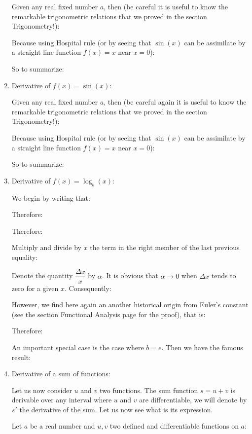\begin{enumerate}
		 Given any real fixed number $a$, then (be careful it is useful to know the remarkable trigonometric relations that we proved in the section Trigonometry!):
		 
		 Because using Hospital rule (or by seeing that $\sin(x)$ can be assimilate by a straight line function $f(x)=x$ near $x=0$):
		 
		 So to summarize:
		 
		 
		 \item Derivative of $f(x)=\sin(x)$:
		 
		 Given any real fixed number $a$, then (be careful again it is useful to know the remarkable trigonometric relations that we proved in the section Trigonometry!):
		 
		 Because using Hospital rule (or by seeing that $\sin(x)$ can be assimilate by a straight line function $f(x)=x$ near $x=0$):
		 
		 So to summarize:
		 
		 \item Derivative of $f(x)=\log_b(x)$:
		 
		 We begin by writing that:
		 
		 Therefore:
		 
		 Therefore:
		 
		 Multiply and divide by $x$ the term in the right member of the last previous equality:
		 
		 Denote the quantity $\dfrac{\Delta x}{x}$ by $\alpha$. It is obvious that $\alpha \rightarrow 0$ when $\Delta x$ tends to zero for a given $x$. Consequently:
		 
		 However, we find here again an another historical origin from Euler's constant (see the section Functional Analysis page \pageref{Euler number} for the proof), that is:
		 
		 Therefore:
		 
		 An important special case is the case where $b = e$. Then we have the famous result:
		  
		 
		 \item Derivative of a sum of functions:
		 
		 Let us now consider $u$ and $v$ two functions. The sum function $s=u+v$ is derivable over any interval where $u$ and $v$ are differentiable, we will denote by $s'$ the derivative of the sum. Let us now see what is its expression.
		 
		 Let $a$ be a real number and $u,v$ two defined and differentiable functions on $a$:
		 

\end{enumerate}
